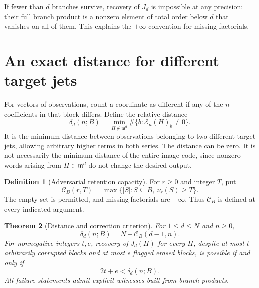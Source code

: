 \documentclass[11pt]{article}
\newtheorem{theorem}{Theorem}[section]
\theoremstyle{definition}
\newtheorem{definition}[theorem]{Definition}
\newcommand{\m}{\mathfrak m}
\newcommand{\E}{\mathcal E}
\newcommand{\capv}{\mathcal C}
\begin{document}
If fewer than $d$ branches survive, recovery of $J_d$ is impossible at any precision: their full branch product is a nonzero element of total order below $d$ that vanishes on all of them. This explains the $+\infty$ convention for missing factorials.

\section{An exact distance for different target jets}\label{sec:distance}

For vectors of observations, count a coordinate as different if any of the $n$ coefficients in that block differs. Define the relative distance
\begin{equation}\label{eq:distance-def}
 \delta_d(n;B)=
 \min_{H\notin\m^d}\#\{b:\E_n(H)_b\ne0\}.
\end{equation}
It is the minimum distance between observations belonging to two different target jets, allowing arbitrary higher terms in both series. The distance can be zero. It is not necessarily the minimum distance of the entire image code, since nonzero words arising from $H\in\m^d$ do not change the desired output.

\begin{definition}[Adversarial retention capacity]\label{def:capacity}
For $r\ge0$ and integer $T$, put
\[
 \capv_B(r,T)=
 \max\{|S|:S\subseteq B,\ \nu_r(S)\ge T\}.
\]
The empty set is permitted, and missing factorials are $+\infty$. Thus $\capv_B$ is defined at every indicated argument.
\end{definition}

\begin{theorem}[Distance and correction criterion]\label{thm:distance}
For $1\le d\le N$ and $n\ge0$,
\begin{equation}\label{eq:distance}
 \boxed{\delta_d(n;B)=N-\capv_B(d-1,n).}
\end{equation}
For nonnegative integers $t,e$, recovery of $J_d(H)$ for every $H$, despite at most $t$ arbitrarily corrupted blocks and at most $e$ flagged erased blocks, is possible if and only if
\begin{equation}\label{eq:correct}
 \boxed{2t+e<\delta_d(n;B).}
\end{equation}
All failure statements admit explicit witnesses built from branch products.
\end{theorem}
\end{document}
